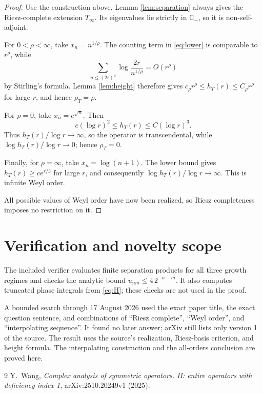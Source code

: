 \documentclass[11pt]{article}
\newcommand{\C}{\mathbb C}
\begin{document}
\begin{proof}
Use the construction above.  Lemma \ref{lem:separation} always gives the
Riesz-complete extension $T_\infty$.  Its eigenvalues lie strictly in
$\C_-$, so it is non-self-adjoint.

For $0<\rho<\infty$, take $x_n=n^{1/\rho}$.  The counting term in
\eqref{eq:lower} is comparable to $r^\rho$, while
\[
 \sum_{n\le(2r)^\rho}\log\frac{2r}{n^{1/\rho}}=O(r^\rho)
\]
by Stirling's formula.  Lemma \ref{lem:height} therefore gives
$c_\rho r^\rho\le h_T(r)\le C_\rho r^\rho$ for large $r$, and hence
$\rho_T=\rho$.

For $\rho=0$, take $x_n=e^{\sqrt n}$.  Then
\[
 c(\log r)^2\le h_T(r)\le C(\log r)^3.
\]
Thus $h_T(r)/\log r\to\infty$, so the operator is transcendental, while
$\log h_T(r)/\log r\to0$; hence $\rho_T=0$.

Finally, for $\rho=\infty$, take $x_n=\log(n+1)$.  The lower bound gives
$h_T(r)\ge c e^{r/3}$ for large $r$, and consequently
$\log h_T(r)/\log r\to\infty$.  This is infinite Weyl order.

All possible values of Weyl order have now been realized, so Riesz
completeness imposes no restriction on it.
\end{proof}

\section{Verification and novelty scope}

The included verifier evaluates finite separation products for all three
growth regimes and checks the analytic bound $u_{nm}\le4\,2^{-n-m}$.  It also
computes truncated phase integrals from \eqref{eq:H}; these checks are not
used in the proof.

A bounded search through 17 August 2026 used the exact paper title, the exact
question sentence, and combinations of ``Riesz complete'', ``Weyl order'',
and ``interpolating sequence''.  It found no later answer; arXiv still lists
only version 1 of the source.  The result uses the source's realization,
Riesz-basis criterion, and height formula.  The interpolating construction and
the all-orders conclusion are proved here.

\begin{thebibliography}{9}
Y.~Wang,
\emph{Complex analysis of symmetric operators. II: entire operators with
deficiency index 1}, arXiv:2510.20249v1 (2025).
\end{thebibliography}
\end{document}
